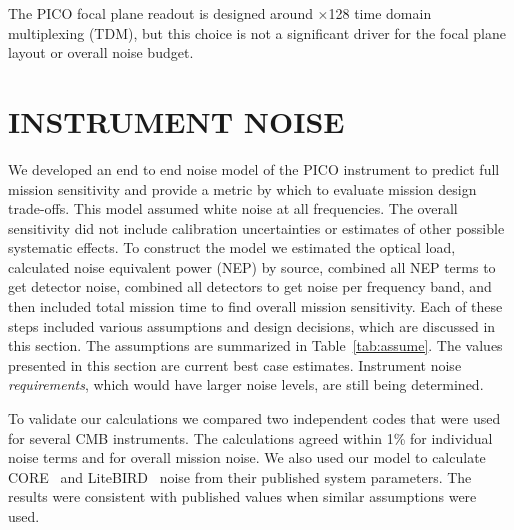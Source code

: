 \documentclass[]{spie}  %
\begin{document}
The PICO focal plane readout is designed around $\times$128 time domain multiplexing (TDM), but this choice is not a 
significant driver for the focal plane layout or overall noise budget. 


\section{INSTRUMENT NOISE}
\label{sec:noise}

We developed an end to end noise model of the PICO instrument to predict full mission sensitivity and 
provide a metric by which to evaluate mission design trade-offs.  This model assumed white noise
at all frequencies. The overall sensitivity did not include calibration uncertainties or estimates of other possible 
systematic effects. To construct the model we estimated the 
optical load, calculated noise equivalent power (NEP) by source, 
combined all NEP terms to get detector noise, combined all detectors to get noise per frequency band, and then 
included total mission time to find overall mission sensitivity.\cite{suzuki2013_thesis,aubin2013_thesis}  
Each of these steps included various assumptions and design decisions, 
which are discussed in this section.  The assumptions are summarized in Table~\ref{tab:assume}.
The values presented in this section are current best case estimates. Instrument noise {\it requirements}, which would have larger 
noise levels, are still being determined.

To validate our calculations we compared two independent codes that were used for several 
CMB instruments.  The calculations agreed within 1\% for individual noise terms 
and for overall mission noise.  We also used our model to calculate CORE~\cite{core2018_inst} and LiteBIRD~\cite{LB2016_optics,suzuki_private} 
noise from their published system parameters. The 
results were consistent with published values when similar assumptions were used.  
\end{document}
